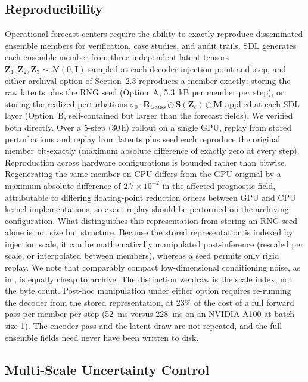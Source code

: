 \documentclass{agujournal2019}
\begin{document}
\subsection{Reproducibility}
\label{sec:reproducibility}

Operational forecast centers require the ability to exactly reproduce disseminated
ensemble members for verification, case studies, and audit trails. SDL generates each ensemble member from three independent latent tensors $\mathbf{Z}_1, \mathbf{Z}_2, \mathbf{Z}_3 \sim \mathcal{N}(0, \mathbf{I})$ sampled at each decoder injection point and step, and either archival option of Section~2.3 reproduces a member exactly: storing the raw latents plus the RNG seed (Option~A, 5.3~kB per member per step), or storing the realized perturbations $\sigma_0 \cdot \mathbf{R}_{\text{Gauss}} \odot \mathbf{S}(\mathbf{Z}_\ell) \odot \mathbf{M}$ applied at each SDL layer (Option~B, self-contained but larger than the forecast fields). We verified both directly. Over a 5-step (30\,h) rollout on a single GPU, replay from stored perturbations and replay from latents plus seed each reproduce the original member bit-exactly (maximum absolute difference of exactly zero at every step). Reproduction across hardware configurations is bounded rather than bitwise. Regenerating the same member on CPU differs from the GPU original by a maximum absolute difference of $2.7\times10^{-2}$ in the affected prognostic field, attributable to differing floating-point reduction orders between GPU and CPU kernel implementations, so exact replay should be performed on the archiving configuration. What distinguishes this representation from storing an RNG seed alone is not size but structure. Because the stored representation is indexed by injection scale, it can be mathematically manipulated post-inference (rescaled per scale, or interpolated between members), whereas a seed permits only rigid replay. We note that comparably compact low-dimensional conditioning noise, as in \cite{alet2024fgn}, is equally cheap to archive. The distinction we draw is the scale index, not the byte count. Post-hoc manipulation under either option requires re-running the decoder from the stored representation, at 23\% of the cost of a full forward pass per member per step (52~ms versus 228~ms on an NVIDIA A100 at batch size 1). The encoder pass and the latent draw are not repeated, and the full ensemble fields need never have been written to disk.


\subsection{Multi-Scale Uncertainty Control}
\label{sec:multi_scale_control}
\end{document}
